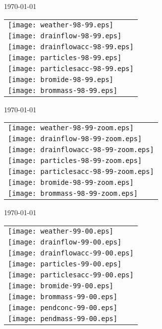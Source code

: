 \documentclass[a4paper]{article}
\begin{document}
\newpage
\today \\
%
\begin{tabular}{l}
\texttt{[image: weather-98-99.eps]} \\
\texttt{[image: drainflow-98-99.eps]} \\
\texttt{[image: drainflowacc-98-99.eps]} \\
\texttt{[image: particles-98-99.eps]} \\
\texttt{[image: particlesacc-98-99.eps]} \\
\texttt{[image: bromide-98-99.eps]} \\
\texttt{[image: brommass-98-99.eps]}
\end{tabular}

\newpage
\today \\
%
\begin{tabular}{l}
\texttt{[image: weather-98-99-zoom.eps]} \\
\texttt{[image: drainflow-98-99-zoom.eps]} \\
\texttt{[image: drainflowacc-98-99-zoom.eps]} \\
\texttt{[image: particles-98-99-zoom.eps]} \\
\texttt{[image: particlesacc-98-99-zoom.eps]} \\
\texttt{[image: bromide-98-99-zoom.eps]} \\
\texttt{[image: brommass-98-99-zoom.eps]}
\end{tabular}

\newpage
\today \\
%
\begin{tabular}{l}
\texttt{[image: weather-99-00.eps]} \\
\texttt{[image: drainflow-99-00.eps]} \\
\texttt{[image: drainflowacc-99-00.eps]} \\
\texttt{[image: particles-99-00.eps]} \\
\texttt{[image: particlesacc-99-00.eps]} \\
\texttt{[image: bromide-99-00.eps]} \\
\texttt{[image: brommass-99-00.eps]} \\
\texttt{[image: pendconc-99-00.eps]} \\
\texttt{[image: pendmass-99-00.eps]}
\end{tabular}
\end{document}
